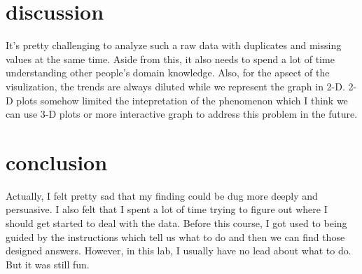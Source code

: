 \documentclass{article}\usepackage[]{graphicx}\usepackage[]{color}
\begin{document}
\section{discussion}
It's pretty challenging to analyze such a raw data with duplicates and missing values at the same time. Aside from this, it also needs to spend a lot of time understanding other people's domain knowledge. Also, for the apsect of the visulization, the trends are always diluted while we represent the graph in 2-D. 2-D plots somehow limited the intepretation of the phenomenon which I think we can use 3-D plots or more interactive graph to address this problem in the future.

\section{conclusion}
Actually, I felt pretty sad that my finding could be dug more deeply and persuasive. I also felt that I spent a lot of time trying to figure out where I should get started to deal with the data. Before this course, I got used to being guided by the instructions which tell us what to do and then we can find those designed answers. However, in this lab, I usually have no lead about what to do. But it was still fun.
\end{document}
